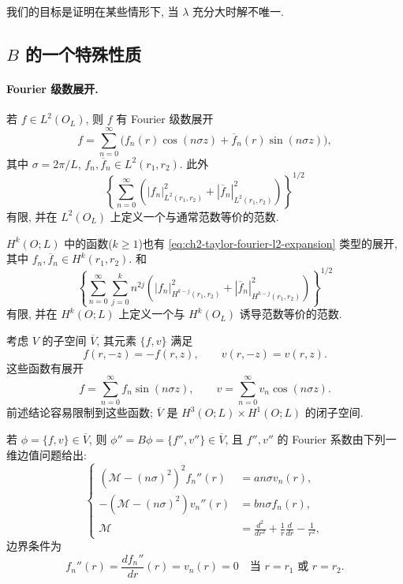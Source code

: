 \begin{Remark}
\label{rem:ch2-taylor-large-parameter-goal}
我们的目标是证明在某些情形下, 当 $\lambda$ 充分大时解不唯一.
\end{Remark}

\subsection{$B$ 的一个特殊性质}
\label{subsec:ch2-taylor-special-property-b}

\paragraph{Fourier 级数展开.}
若 $f\in L^2(O_L)$, 则 $f$ 有 Fourier 级数展开
\begin{equation}
f=\sum_{n=0}^{\infty}
\bigl(f_n(r)\cos(n\sigma z)+\overline f_n(r)\sin(n\sigma z)\bigr),
\label{eq:ch2-taylor-fourier-l2-expansion}
\end{equation}
其中 $\sigma=2\pi/L$, $f_n,\overline f_n\in L^2(r_1,r_2)$. 此外
\[
\left\{\sum_{n=0}^{\infty}
\left(|f_n|_{L^2(r_1,r_2)}^2+|\overline f_n|_{L^2(r_1,r_2)}^2\right)\right\}^{1/2}
\]
有限, 并在 $L^2(O_L)$ 上定义一个与通常范数等价的范数.

$H^k(O;L)$ 中的函数($k\geq1$)也有 \eqref{eq:ch2-taylor-fourier-l2-expansion} 类型的展开, 其中 $f_n,\overline f_n\in H^k(r_1,r_2)$. 和
\begin{equation}
\left\{\sum_{n=0}^{\infty}\sum_{j=0}^{k}n^{2j}
\left(|f_n|_{H^{k-j}(r_1,r_2)}^2
+|\overline f_n|_{H^{k-j}(r_1,r_2)}^2\right)\right\}^{1/2}
\label{eq:ch2-taylor-fourier-sobolev-norm}
\end{equation}
有限, 并在 $H^k(O;L)$ 上定义一个与 $H^k(O_L)$ 诱导范数等价的范数.

考虑 $V$ 的子空间 $\overline V$, 其元素 $\{f,v\}$ 满足
\[
f(r,-z)=-f(r,z),
\qquad
v(r,-z)=v(r,z).
\]
这些函数有展开
\begin{equation}
f=\sum_{n=0}^{\infty}f_n\sin(n\sigma z),
\qquad
v=\sum_{n=0}^{\infty}v_n\cos(n\sigma z).
\label{eq:ch2-taylor-parity-fourier-expansion}
\end{equation}
前述结论容易限制到这些函数; $\overline V$ 是 $H^3(O;L)\times H^1(O;L)$ 的闭子空间.

若 $\phi=\{f,v\}\in\overline V$, 则 $\phi''=B\phi=\{f'',v''\}\in\overline V$, 且 $f'',v''$ 的 Fourier 系数由下列一维边值问题给出:
\begin{equation}
\left\{
\begin{aligned}
(\mathcal M-(n\sigma)^2)^2f_n''(r)&=an\sigma v_n(r),\\
-(\mathcal M-(n\sigma)^2)v_n''(r)&=bn\sigma f_n(r),\\
\mathcal M&=\frac{d^2}{dr^2}+\frac1r\frac d{dr}-\frac1{r^2},
\end{aligned}
\right.
\label{eq:ch2-taylor-fourier-boundary-system}
\end{equation}
边界条件为
\begin{equation}
f_n''(r)=\frac{df_n''}{dr}(r)=v_n(r)=0
\quad\text{当 }r=r_1\text{ 或 }r=r_2.
\label{eq:ch2-taylor-fourier-boundary-conditions}
\end{equation}

